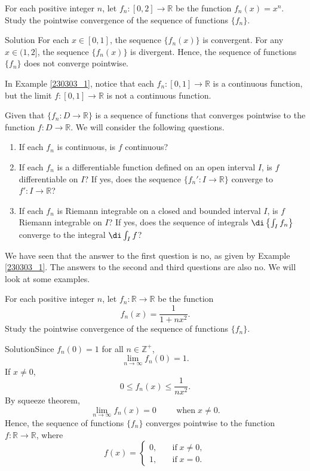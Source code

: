 \begin{example}[label=230303_2]{}
 For each positive integer $n$, let $f_n:[0,2]\to\mathbb{R}$ be the function $f_n(x)=x^n$. Study the pointwise convergence of the sequence of functions $\{f_n\}$.\end{example}
\begin{solution}{Solution}
  For each $x\in [0,1]$, the sequence $\{f_n(x)\}$ is convergent. For any $x\in (1, 2]$, the sequence $\{f_n(x)\}$ is divergent. Hence, the sequence of functions $\{f_n\}$ does not converge pointwise.
\end{solution}
\begin{highlight}{}
In Example \ref{230303_1}, notice that each   $f_n:[0,1]\to\mathbb{R}$  is a  continuous function, but the limit  $f:[0,1]\to\mathbb{R}$ is not  a continuous function.

 Given that $\{f_n:D\to\mathbb{R}\}$ is a sequence of functions that converges pointwise to the function $f:D\to\mathbb{R}$.  We will consider the following questions.
\begin{enumerate}[1.]
\item If each $f_n$ is continuous, is $f$ continuous?
\item If each $f_n$ is a differentiable function defined on an open interval $I$, is $f$ differentiable on $I$? If yes, does the sequence $\{f_n':I\to\mathbb{R}\}$ converge to $f':I\to\mathbb{R}$?
\item If each $f_n$ is Riemann  integrable on a closed and bounded interval $I$, is $f$ Riemann integrable on $I$? If yes, does 
the sequence of integrals $\di\left\{\int_If_n \right\}$ converge to the integral $\di\int_I f$?
\end{enumerate}We have seen that the answer to the first question is no, as given by Example \ref{230303_1}. The answers to the second  and third questions are also no. We will look at some examples.
\end{highlight}
 
 
\begin{example}[label=230303_3]{}
 For each positive integer $n$, let $f_n:\mathbb{R}\to\mathbb{R}$ be the function \[f_n(x)=\frac{1}{1+nx^2}.\]
  Study the pointwise convergence of the sequence of functions $\{f_n\}$.

\end{example}
\begin{solution}{Solution}Since $f_n(0)=1$ for all $n\in\mathbb{Z}^+$,
\[
\lim_{n\to\infty}f_n(0)=1.
\]If $x\neq 0$, 
\[0\leq f_n(x)\leq \frac{1}{nx^2}.\] \bs
By squeeze theorem,
\[\lim_{n\to\infty}f_n(x)=0\hspace{1cm}\text{when}\;x\neq 0.\]
Hence, the sequence  of functions $\{f_n\}$ converges pointwise to the function $f:\mathbb{R}\to\mathbb{R}$, where
 \[f(x)=\begin{cases}0,\quad &\text{if}\;x\neq 0,\\1,\quad &\text{if}\; x=0.\end{cases}\]
\end{solution}


